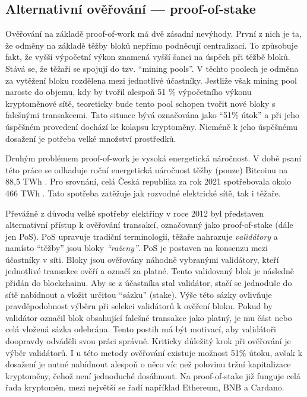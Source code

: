 \subsection{Alternativní ověřování --- proof-of-stake}
\label{proof-of-stake-subsection}
Ověřování na základě proof-of-work má dvě zásadní nevýhody. První z nich je ta, že odměny na základě těžby bloků nepřímo podněcují centralizaci.
To způsobuje fakt, že vyšší výpočetní výkon znamená vyšší šanci na úspěch při těžbě bloků. Stává se, že těžaři se spojují do tzv. \enquote{mining pools}.
V těchto poolech je odměna za vytěžení bloku rozdělena mezi jednotlivé účastníky. Jestliže však mining pool naroste do objemu, kdy by tvořil
alespoň 51 \% výpočetního výkonu kryptoměnové sítě, teoreticky bude tento pool schopen tvořit nové bloky s falešnými transakcemi. Tato situace
bývá označována jako \enquote{51\% útok} a při jeho úspěšném provedení dochází ke kolapsu kryptoměny. Nicméně k jeho úspěšnému dosažení je potřeba velké množství prostředků.

Druhým problémem proof-of-work je vysoká energetická náročnost. V době psaní této práce se odhaduje roční energetická náročnost těžby (pouze) Bitcoinu
na 88,5 TWh \cite{crypto:energy-consumption-bitcon}. Pro srovnání, celá Česká republika za rok 2021 spotřebovala okolo 466 TWh \cite{crypto:energy-consumption-czechia}.
Tato spotřeba zatěžuje jak rozvodné elektrické sítě, tak i těžaře.

Převážně z důvodu velké spotřeby elektřiny v roce 2012 byl představen alternativní přístup k ověřování transakcí, označovaný jako proof-of-stake (dále jen PoS).
PoS upravuje tradiční terminologii, těžaře nahrazuje \emph{validátory} a namísto \enquote{těžby} jsou bloky \emph{\enquote{raženy}}. PoS je
postaven na konsenzu mezi účastníky v síti. Bloky jsou ověřovány náhodně vybranými validátory, kteří jednotlivé transakce ověří a označí za platné.
Tento validovaný blok je následně přidán do blockchainu. Aby se z účastníka stal validátor, stačí se jednoduše do sítě nabídnout a vložit určitou
\enquote{sázku} (stake). Výše této sázky ovlivňuje pravděpodobnost výběru při selekci validátorů k ověření bloku. Pokud by validátor označil
blok obsahující falešné transakce jako platný, je mu část nebo celá vložená sázka odebrána. Tento postih má být motivací, aby validátoři doopravdy
odváděli svou práci správně. Kriticky důležitý krok při ověřování je výběr validátorů. I u této metody ověřování existuje možnost 51\% útoku,
avšak k dosažení je nutné nabídnout alespoň o něco víc než polovinu tržní kapitalizace kryptoměny, čehož není jednoduché dosáhnout.
Na proof-of-stake již funguje celá řada kryptoměn, mezi největší se řadí například Ethereum, BNB a Cardano.

